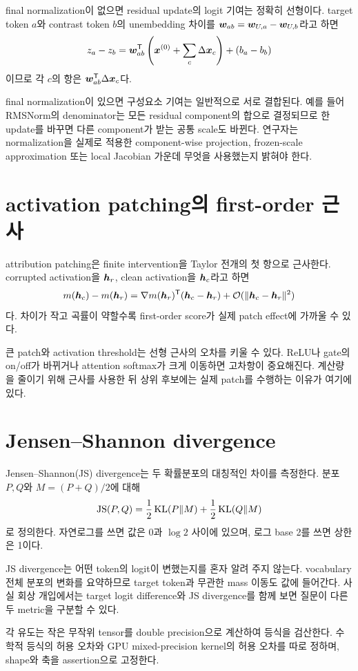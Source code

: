 final normalization이 없으면 residual update의 logit 기여는 정확히 선형이다.
target token $a$와 contrast token $b$의 unembedding 차이를 $\bm{w}_{ab}=\bm{w}_{U,a}-\bm{w}_{U,b}$라고 하면
\begin{equation}
  z_a-z_b=\bm{w}_{ab}^{\mathsf T}
  \left(\bm{x}^{(0)}+\sum_c\Delta\bm{x}_c\right)+(b_a-b_b)
\end{equation}
이므로 각 $c$의 항은 $\bm{w}_{ab}^{\mathsf T}\Delta\bm{x}_c$다.

final normalization이 있으면 구성요소 기여는 일반적으로 서로 결합된다.
예를 들어 RMSNorm의 denominator는 모든 residual component의 합으로 결정되므로 한 update를 바꾸면 다른 component가 받는 공통 scale도 바뀐다.
연구자는 normalization을 실제로 적용한 component-wise projection, frozen-scale approximation 또는 local Jacobian 가운데 무엇을 사용했는지 밝혀야 한다.

\section{activation patching의 first-order 근사}

attribution patching은 finite intervention을 Taylor 전개의 첫 항으로 근사한다.
corrupted activation을 $\bm{h}_r$, clean activation을 $\bm{h}_c$라고 하면
\begin{equation}
  m(\bm{h}_c)-m(\bm{h}_r)
  =\nabla m(\bm{h}_r)^{\mathsf T}(\bm{h}_c-\bm{h}_r)
  +\mathcal{O}(\lVert\bm{h}_c-\bm{h}_r\rVert^2)
\end{equation}
다.
차이가 작고 곡률이 약할수록 first-order score가 실제 patch effect에 가까울 수 있다.

큰 patch와 activation threshold는 선형 근사의 오차를 키울 수 있다.
ReLU나 gate의 on/off가 바뀌거나 attention softmax가 크게 이동하면 고차항이 중요해진다.
계산량을 줄이기 위해 근사를 사용한 뒤 상위 후보에는 실제 patch를 수행하는 이유가 여기에 있다.

\section{Jensen--Shannon divergence}

Jensen--Shannon(JS) divergence는 두 확률분포의 대칭적인 차이를 측정한다.
분포 $P,Q$와 $M=(P+Q)/2$에 대해
\begin{equation}
  \operatorname{JS}(P,Q)=\frac12\operatorname{KL}(P\|M)+\frac12\operatorname{KL}(Q\|M)
\end{equation}
로 정의한다.
자연로그를 쓰면 값은 $0$과 $\log 2$ 사이에 있으며, 로그 base 2를 쓰면 상한은 1이다.

JS divergence는 어떤 token의 logit이 변했는지를 혼자 알려 주지 않는다.
vocabulary 전체 분포의 변화를 요약하므로 target token과 무관한 mass 이동도 값에 들어간다.
사실 회상 개입에서는 target logit difference와 JS divergence를 함께 보면 질문이 다른 두 metric을 구분할 수 있다.

\begin{studybox}
각 유도는 작은 무작위 tensor를 double precision으로 계산하여 등식을 검산한다.
수학적 등식의 허용 오차와 GPU mixed-precision kernel의 허용 오차를 따로 정하며, shape와 축을 assertion으로 고정한다.
\end{studybox}
